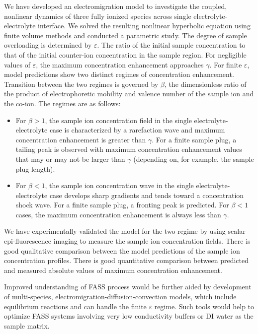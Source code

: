 \documentclass[lineno,authoryear]{FLO_v1}%
\theoremstyle{definition}
\begin{document}
We have developed an electromigration model to investigate
the coupled, nonlinear dynamics of three fully ionized
species across single electrolyte-electrolyte interface. We
solved the resulting nonlinear hyperbolic equation using
finite volume methods and conducted a parametric study. The
degree of sample overloading is determined by
$\varepsilon$. The ratio of the initial sample
concentration to that of the initial counter-ion
concentration in the sample region. For negligible values
of $\varepsilon$, the maximum concentration enhancement
approaches $\gamma$. For finite $\varepsilon$, model
predictions show two distinct regimes of concentration
enhancement. Transition between the two regimes is governed
by $\beta$, the dimensionless ratio of the product of
electrophoretic mobility and valence number of the sample
ion and the co-ion. The regimes are as follows:
\begin{itemize}
\item For $\beta > 1$, the sample ion concentration
field in the single electrolyte-electrolyte case is
characterized by a rarefaction wave and maximum
concentration enhancement is greater than $\gamma$. For
a finite sample plug, a tailing peak is observed with
maximum concentration enhancement values that may or
may not be larger than $\gamma$ (depending on, for
example, the sample plug length).
\item For $\beta < 1$, the sample ion concentration wave
in the single electrolyte-electrolyte case develops
sharp gradients and tends toward a concentration shock
wave. For a finite sample plug, a fronting peak is
predicted. For $\beta <1$ cases, the maximum
concentration enhancement is always less than $\gamma$.
\end{itemize}
We have experimentally validated the model for the two
regime by using scalar epi-fluorescence imaging to measure
the sample ion concentration fields. There is good
qualitative comparison between the model predictions of the
sample ion concentration profiles. There is good
quantitative comparison between predicted and measured
absolute values of maximum concentration enhancement.

Improved understanding of FASS process would be further
aided by development of multi-species,
electromigration-diffusion-convection models, which include
equilibrium reactions and can handle the finite
$\varepsilon $ regime. Such tools would help to optimize
FASS systems involving very low conductivity buffers or DI
water as the sample matrix.\clearpage
\end{document}
